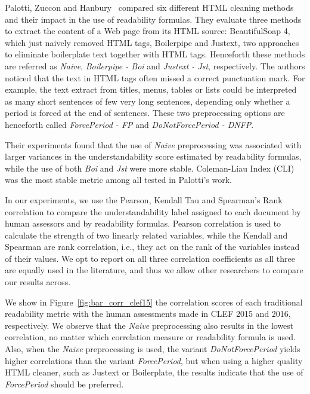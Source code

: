 Palotti, Zuccon and Hanbury~\cite{palotti15} compared six different HTML cleaning methods and their impact in the use of readability formulas.
They evaluate three methods to extract the content of a Web page from its HTML source: BeautifulSoap 4, which just naively removed HTML tags, Boilerpipe\cite{kohlschutter10} and Justext\cite{jan11}, two approaches to eliminate boilerplate text together with HTML tags. Henceforth these methods are referred as \textit{Naive}, \textit{Boilerpipe - Boi} and \textit{Justext - Jst}, respectively.
The authors noticed that the text in HTML tags often missed a correct punctuation mark. For example, the text extract from titles, menus, tables or lists could be interpreted as many short sentences of few very long sentences, depending only whether a period is forced at the end of sentences. These two preprocessing options are henceforth called \textit{ForcePeriod - FP} and \textit{DoNotForcePeriod - DNFP}.

Their experiments found that the use of \textit{Naive} preprocessing was associated with larger variances in the understandability score estimated by readability formulas, while the use of both \textit{Boi} and \textit{Jst} were more stable. Coleman-Liau Index (CLI) was the most stable metric among all tested in Palotti's work\cite{palotti15}.

In our experiments, we use the Pearson, Kendall Tau and Spearman's Rank correlation to compare the understandability label assigned to each document by human assessors and by readability formulas.
Pearson correlation is used to calculate the strength of two linearly related variables, while the Kendall and Spearman are rank correlation, i.e., they act on the rank of the variables instead of their values. We opt to report on all three correlation coefficients as all three are equally used in the literature, and thus we allow other researchers to compare our results across.

We show in Figure~\ref{fig:bar_corr_clef15} %
the correlation scores of each traditional readability metric with the human assessments made in CLEF 2015 and 2016, respectively. We observe that the \textit{Naive} preprocessing also results in the lowest
correlation, no matter which correlation measure or readability formula is used. Also, when the \textit{Naive} preprocessing is used, the variant \textit{DoNotForcePeriod} yields higher correlations than the variant \textit{ForcePeriod}, but when using a higher quality HTML cleaner, such as Justext or Boilerplate, the results indicate that the use of \textit{ForcePeriod} should be preferred.

